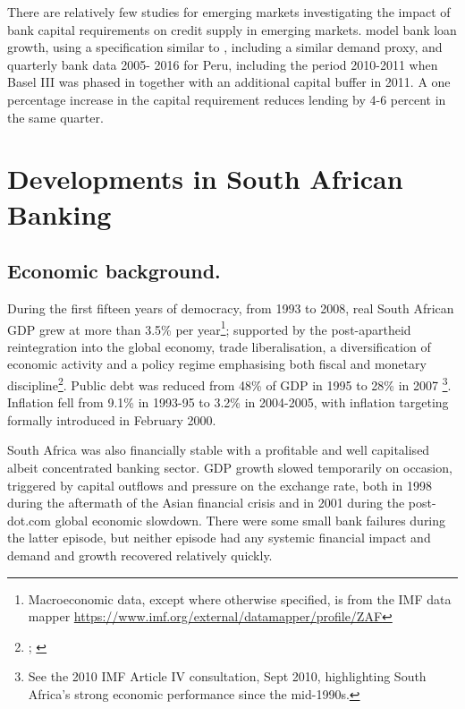 \documentclass[
  12,
]{article}
\begin{document}
There are relatively few studies for emerging markets investigating the impact of bank capital requirements on credit supply in emerging markets. \citet{fang2020bank} model bank loan growth, using a specification similar to \citet{aiyar2016does}, including a similar demand proxy, and quarterly bank data 2005- 2016 for Peru, including the period 2010-2011 when Basel III was phased in together with an additional capital buffer in 2011. A one percentage increase in the capital requirement reduces lending by 4-6 percent in the same quarter.

\hypertarget{economic}{%
\section{Developments in South African Banking}\label{economic}}

\hypertarget{economic-background.}{%
\subsection{Economic background.}\label{economic-background.}}

During the first fifteen years of democracy, from 1993 to 2008, real South African GDP grew at more than 3.5\% per year\footnote{Macroeconomic data, except where otherwise specified, is from the IMF data mapper \url{https://www.imf.org/external/datamapper/profile/ZAF}}; supported by the post-apartheid reintegration into the global economy, trade liberalisation, a diversification of economic activity and a policy regime emphasising both fiscal and monetary discipline\footnote{\citet{nowak2005first}; \citet{nowak2006post}}. Public debt was reduced from 48\% of GDP in 1995 to 28\% in 2007 \footnote{See the 2010 IMF Article IV consultation, Sept 2010, highlighting South Africa's strong economic performance since the mid-1990s.}. Inflation fell from 9.1\% in 1993-95 to 3.2\% in 2004-2005, with inflation targeting formally introduced in February 2000.

South Africa was also financially stable with a profitable and well capitalised albeit concentrated banking sector. GDP growth slowed temporarily on occasion, triggered by capital outflows and pressure on the exchange rate, both in 1998 during the aftermath of the Asian financial crisis and in 2001 during the post-dot.com global economic slowdown. There were some small bank failures during the latter episode, but neither episode had any systemic financial impact and demand and growth recovered relatively quickly.
\end{document}
